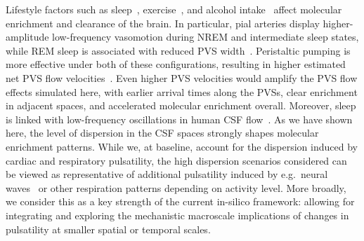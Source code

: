 \documentclass[fleqn,10pt]{wlscirep}
\begin{document}
Lifestyle factors such as sleep~\cite{xie2013sleep, miao2024brain,
  bojarskaite2023sleep, eide2021sleep, vinje2023human,
  hauglund2025norepinephrine, larsen2024sleep},
exercise~\cite{holstein2018voluntary, yildiz2022immediate}, and
alcohol intake~\cite{lundgaard2018beneficial} affect molecular
enrichment and clearance of the brain. In particular, pial arteries
display higher-amplitude low-frequency vasomotion during NREM and
intermediate sleep states, while REM sleep is associated with reduced
PVS width~\cite{bojarskaite2023sleep}. Peristaltic pumping is more
effective under both of these configurations, resulting in higher
estimated net PVS flow velocities~\cite{gjerde2023directional}. Even
higher PVS velocities would amplify the PVS flow effects simulated
here, with earlier arrival times along the PVSs, clear enrichment in
adjacent spaces, and accelerated molecular enrichment
overall. Moreover, sleep is linked with low-frequency oscillations in
human CSF flow~\cite{fultz2019coupled}. As we have shown here, the
level of dispersion in the CSF spaces strongly shapes molecular
enrichment patterns. While we, at baseline, account for the dispersion
induced by cardiac and respiratory pulsatility, the high dispersion
scenarios considered can be viewed as representative of additional
pulsatility induced by e.g.~neural waves~\cite{fultz2019coupled,
  williams2023neural} or other respiration patterns depending on
activity level. More broadly, we consider this as a key strength of
the current in-silico framework: allowing for integrating and
exploring the mechanistic macroscale implications of changes in
pulsatility at smaller spatial or temporal scales.

\end{document}
